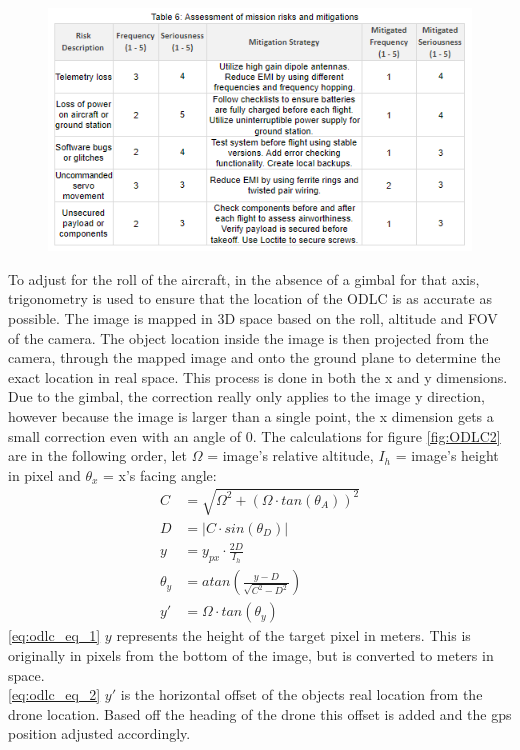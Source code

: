 \begin{figure}[h]\centering
\includegraphics[width=0.75\linewidth]{table/Table_6_Assessment_of_mission_risks_and_mitigations.PNG}
\caption*{}
\label{fig:Table_6_Assessment_of_mission_risks_and_mitigations}
\end{figure}

\twocolumn

To adjust for the roll of the aircraft, in the absence of a gimbal for that axis, trigonometry is used to ensure that the location of the ODLC is as accurate as possible. The image is mapped in 3D space based on the roll, altitude and FOV of the camera. The object location inside the image is then projected from the camera, through the mapped image and onto the ground plane to determine the exact location in real space. This process is done in both the x and y dimensions. Due to the gimbal, the correction really only applies to the image y direction, however because the image is larger than a single point, the x dimension gets a small correction even with an angle of 0.  The calculations for figure \ref{fig:ODLC2} are in the following order, let $\Omega$  = image's relative altitude, $I_h$ = image's height in pixel and $\theta_x$ = x's facing angle:
\begin{align*}
C & = \sqrt{\Omega^2+(\Omega \cdot tan(\theta_A))^2}
\\D & =|C \cdot sin(\theta_D)| \\
y & = y_{px} \cdot \frac{2D}{ I_h}  \label{eq:odlc_eq_1}\tag{1}
\\ \theta_y & = atan(\frac{y-D}{\sqrt{C^2-D^2}})
\\y'& = \Omega \cdot tan(\theta _y) \label{eq:odlc_eq_2}\tag{2}
\end{align*}
\eqref{eq:odlc_eq_1} $y$ represents the height of the target pixel in meters. This is originally in pixels from the bottom of the image, but is converted to meters in space. \\
\eqref{eq:odlc_eq_2} $y'$ is the horizontal offset of the objects real location from the drone location. Based off the heading of the drone this offset is added and the gps position adjusted accordingly.

